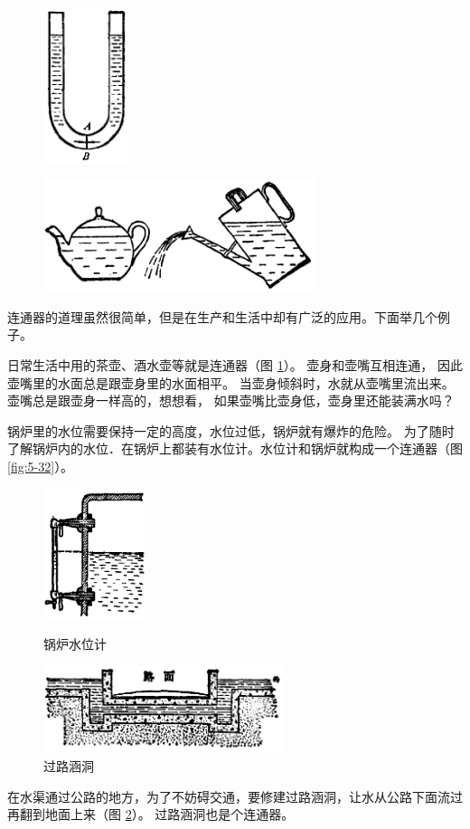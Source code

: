 \begin{figure}[htbp]
    \centering
    \begin{minipage}{5cm}
    \centering
    \includegraphics[width=2.5cm]{../pic/czwl1-ch5-30}
    \caption{}\label{fig:5-30}
    \end{minipage}
    \qquad
    \begin{minipage}{9cm}
    \centering
    \includegraphics[width=8cm]{../pic/czwl1-ch5-31}
    \caption{}\label{fig:5-31}
    \end{minipage}
\end{figure}

连通器的道理虽然很简单，但是在生产和生活中却有广泛的应用。下面举几个例子。

日常生活中用的茶壶、酒水壶等就是连通器（图 \ref{fig:5-31}）。
壶身和壶嘴互相连通， 因此壶嘴里的水面总是跟壶身里的水面相平。
当壶身倾斜时，水就从壶嘴里流出来。壶嘴总是跟壶身一样高的，想想看，
如果壶嘴比壶身低，壶身里还能装满水吗？

锅炉里的水位需要保持一定的高度，水位过低，锅炉就有爆炸的危险。
为了随时了解锅炉内的水位．在锅炉上都装有水位计。水位计和锅炉就构成一个连通器（图 \ref{fig:5-32}）。

\begin{figure}[htbp]
    \centering
    \begin{minipage}{5cm}
    \centering
    \includegraphics[width=3cm]{../pic/czwl1-ch5-32}
    \caption{锅炉水位计}\label{fig:5-32}
    \end{minipage}
    \qquad
    \begin{minipage}{9cm}
    \centering
    \includegraphics[width=7cm]{../pic/czwl1-ch5-33}
    \caption{过路涵洞}\label{fig:5-33}
    \end{minipage}
\end{figure}

在水渠通过公路的地方，为了不妨碍交通，要修建过路涵洞，让水从公路下面流过再翻到地面上来（图 \ref{fig:5-33}）。
过路涵洞也是个连通器。

